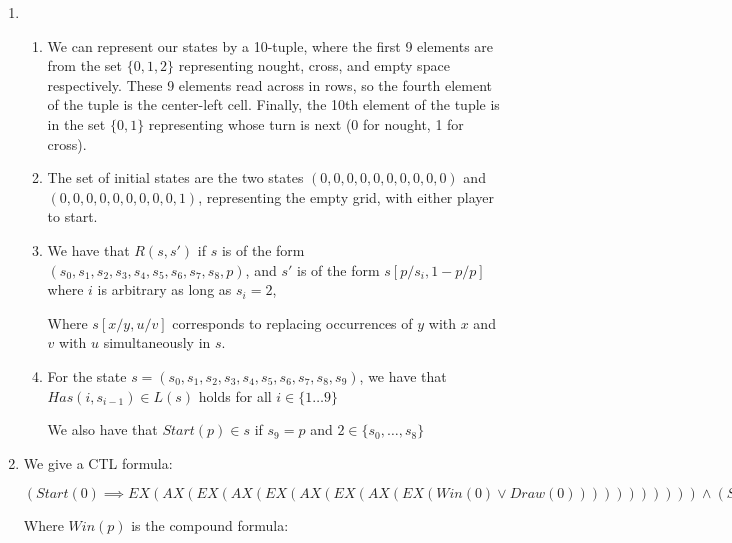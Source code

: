 

    

\begin{enumerate}[label=(\alph*)]

  \item
  \begin{enumerate}[label=(\roman*)]
      
  \item
    We can represent our states by a 10-tuple, where the first 9 elements are from the set $\{0,1,2\}$ representing nought, cross, and empty space respectively. These 9 elements read across in rows, so the fourth element of the tuple is the center-left cell. Finally, the 10th element of the tuple is in the set $\{0,1\}$ representing whose turn is next (0 for nought, 1 for cross).

    \item
      

      The set of initial states are the two states $(0,0,0,0,0,0,0,0,0,0)$ and $(0,0,0,0,0,0,0,0,0,1)$, representing the empty grid, with either player to start.

      \item


        We have that $R(s,s')$ if $s$ is of the form $(s_0, s_1, s_2, s_3, s_4, s_5, s_6, s_7, s_8, p)$, and $s'$ is of the form $s[p / s_i, 1-p / p]$ where $i$ is arbitrary as long as $s_i = 2$, 

        Where $s[x / y, u / v]$ corresponds to replacing occurrences of $y$ with $x$ and $v$ with $u$ simultaneously in $s$.

        \item
          For the state $s = (s_0, s_1, s_2, s_3, s_4, s_5, s_6, s_7, s_8, s_9)$, we have that $Has(i, s_{i-1}) \in L(s)$ holds for all $i \in \{1\ldots9\}$

          We also have that $Start(p) \in s$ if $s_9 = p$ and $2 \in \{s_0, \ldots, s_8\}$
    
  \end{enumerate}

  \item
    We give a CTL formula:

    $(Start(0) \implies E X (A X (E X (A X (E X (A X (E X (A X (E X (Win(0) \vee Draw(0))))))))))) \wedge (Start(1) \implies E X (A X (E X (A X (E X (A X (E X (A X (E X (Win(1) \vee Draw(1)))))))))))$

    Where $Win(p)$ is the compound formula:


\end{enumerate}
